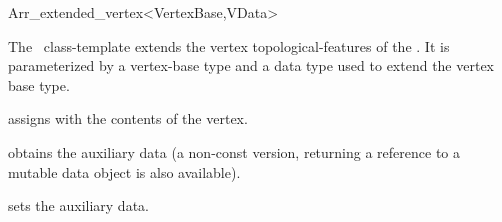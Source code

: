 
\ccRefPageBegin

\begin{ccRefClass}{Arr_extended_vertex<VertexBase,VData>}

\ccDefinition
  The \ccRefName\ class-template extends the vertex
  topological-features of the \dcel. It is parameterized by a
  vertex-base type  and a data type  used to extend
  the vertex base type.


\ccIsModel

\ccInheritsFrom

\ccCreation
{}
  {assigns \ccVar{} with the contents of the  vertex.}

\ccAccessFunctions

\def\ccLongParamLayout{\ccTrue}
  {obtains the auxiliary data (a non-const version, returning a reference
   to a mutable data object is also available).}
\def\ccLongParamLayout{\ccFalse}

\ccModifiers
  {sets the auxiliary data.}

\ccSeeAlso

\end{ccRefClass}

\ccRefPageEnd
